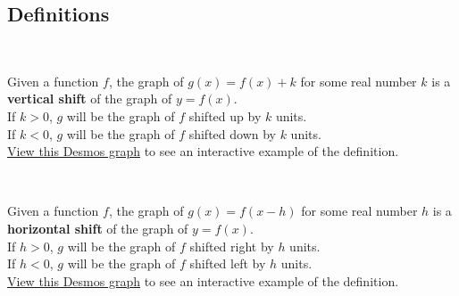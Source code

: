 \newpage

\subsection*{Definitions} \label{def-functions-transformations}

\begin{myDefinition}~\\[0.5mm]
\begin{minipage}{0.9\linewidth}
Given a function $f$, the graph of  $g(x) = f(x) +k$ for some real number $k$ is a {\bf vertical shift} of the graph of $y=f(x)$.\\[2mm]
If $k>0$, $g$ will be the graph of $f$ shifted up by $k$ units.\\
If $k<0$, $g$ will be the graph of $f$ shifted down by $k$ units.\\[0.4em]
 \href{https://tiny.cc/111Z-VertShift}{View this Desmos graph} to see an interactive example of the definition. %
\end{minipage}
\begin{minipage}{0.1\linewidth}
\flushright {}
\end{minipage}
\end{myDefinition}


\begin{myDefinition}~\\[0.5mm]
\begin{minipage}{0.9\linewidth}
Given a function $f$, the graph of $g(x) = f(x-h)$ for some real number $h$ is a {\bf horizontal shift} of the graph of $y=f(x)$.\\[2mm]
If $h>0$, $g$ will be the graph of $f$ shifted right by $h$ units.\\
If $h<0$, $g$ will be the graph of $f$ shifted left by $h$ units.\\[0.4em]
 \href{https://tiny.cc/111Z-HorizShift}{View this Desmos graph} to see an interactive example of the definition.  %
\end{minipage}
\begin{minipage}{0.1\linewidth}
\flushright {}
\end{minipage}
\end{myDefinition}



